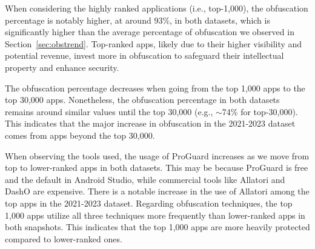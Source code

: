 When considering the highly ranked applications (i.e., top-1,000), the obfuscation percentage is notably higher, at around 93\%, in both datasets, which is significantly higher than the average percentage of obfuscation we observed in Section~\ref{sec:obstrend}. Top-ranked apps, likely due to their higher visibility and potential revenue, invest more in obfuscation to safeguard their intellectual property and enhance security. 

The obfuscation percentage decreases when going from the top 1,000 apps to the top 30,000 apps. Nonetheless, the obfuscation percentage in both datasets remains around similar values until the top 30,000 (e.g., $\sim$74\% for top-30,000). This indicates that the major increase in obfuscation in the 2021-2023 dataset comes from apps beyond the top 30,000.

When observing the tools used, the usage of ProGuard increases as we move from top to lower-ranked apps in both datasets. This may be because ProGuard is free and the default in Android Studio, while commercial tools like Allatori and DashO are expensive. There is a notable increase in the use of Allatori among the top apps in the 2021-2023 dataset. Regarding obfuscation techniques, the top 1,000 apps utilize all three techniques more frequently than lower-ranked apps in both snapshots. This indicates that the top 1,000 apps are more heavily protected compared to lower-ranked ones.

